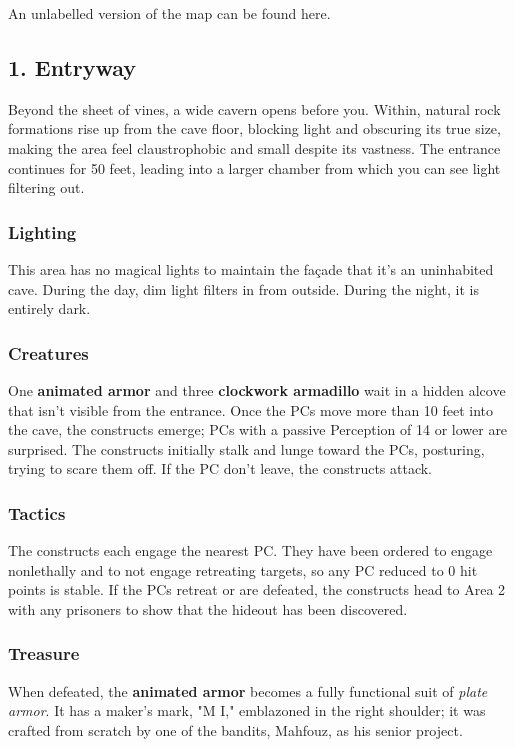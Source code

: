 \documentclass[10pt,a4paper,twoside,bg=print,twocolumn,openany,nodeprecatedcode]{dndbook}
\begin{document}
An unlabelled version of the map can be found here.

\subsection{1. Entryway}
\begin{DndReadAloud}{}
Beyond the sheet of vines, a wide cavern opens before you. Within, natural rock formations rise up from the cave floor, blocking light and obscuring its true size, making the area feel claustrophobic and small despite its vastness. The entrance continues for 50 feet, leading into a larger chamber from which you can see light filtering out.

\end{DndReadAloud}

\subsubsection{Lighting}
This area has no magical lights to maintain the façade that it's an uninhabited cave. During the day, dim light filters in from outside. During the night, it is entirely dark.

\subsubsection{Creatures}
One \textbf{animated armor} and three \textbf{clockwork armadillo} wait in a hidden alcove that isn't visible from the entrance. Once the PCs move more than 10 feet into the cave, the constructs emerge; PCs with a passive Perception of 14 or lower are surprised. The constructs initially stalk and lunge toward the PCs, posturing, trying to scare them off. If the PC don't leave, the constructs attack.

\subsubsection{Tactics}
The constructs each engage the nearest PC. They have been ordered to engage nonlethally and to not engage retreating targets, so any PC reduced to 0 hit points is stable. If the PCs retreat or are defeated, the constructs head to Area 2 with any prisoners to show that the hideout has been discovered.

\subsubsection{Treasure}
When defeated, the \textbf{animated armor} becomes a fully functional suit of \textit{plate armor}. It has a maker's mark, "M I," emblazoned in the right shoulder; it was crafted from scratch by one of the bandits, Mahfouz, as his senior project.
\end{document}
